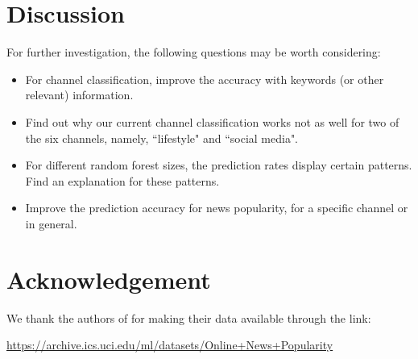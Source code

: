 \documentclass{article} %
\begin{document}
\section{Discussion}

For further investigation, the following questions may be worth considering:
\begin{itemize}
	\item For channel classification, improve the accuracy with keywords (or other relevant) information.
	\item Find out why our current channel classification works not as well for two of the six channels, namely, ``lifestyle" and ``social media". 
	\item For different random forest sizes, the prediction rates display certain patterns. Find an explanation for these patterns.
	\item Improve the prediction accuracy for news popularity, for a specific channel or in general.
\end{itemize}




\section{Acknowledgement}

We thank the authors of \cite{FVC14} for making  their data available through the link: 

\url{https://archive.ics.uci.edu/ml/datasets/Online+News+Popularity}








\newpage
\end{document}
